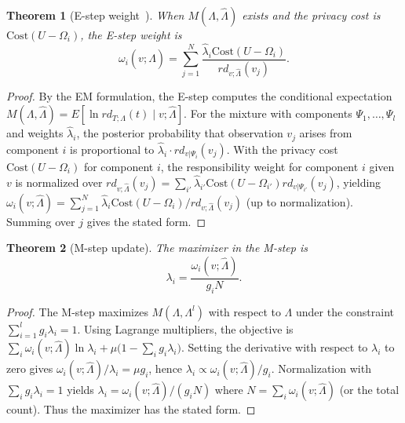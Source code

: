 \documentclass[journal,transmag]{IEEEtran}
\newtheorem{theorem}{Theorem}[section]
\begin{document}
\begin{theorem}[E-step weight~\cite{dempster-laird-rubin-77}]
\label{thm:estep}
When $M(\Lambda,\hat{\Lambda})$ exists and the privacy cost is $\mathrm{Cost}(U - \Omega_i)$, the E-step weight is
\begin{equation}
\omega_i(v;\hat{\Lambda}) = \sum_{j=1}^N \frac{\hat{\lambda}_i \mathrm{Cost}(U - \Omega_i)}{rd_{v;\hat{\Lambda}}(v_j)}.
\end{equation}
\end{theorem}
\begin{proof}
By the EM formulation, the E-step computes the conditional expectation $M(\Lambda,\hat{\Lambda}) = E[\ln rd_{T;\Lambda}(t) \mid v; \hat{\Lambda}]$. For the mixture with components $\Psi_1,\ldots,\Psi_l$ and weights $\hat{\lambda}_i$, the posterior probability that observation $v_j$ arises from component $i$ is proportional to $\hat{\lambda}_i \cdot rd_{v|\Psi_i}(v_j)$. With the privacy cost $\mathrm{Cost}(U - \Omega_i)$ for component $i$, the responsibility weight for component $i$ given $v$ is normalized over $rd_{v;\hat{\Lambda}}(v_j) = \sum_{i'} \hat{\lambda}_{i'} \mathrm{Cost}(U - \Omega_{i'}) rd_{v|\Psi_{i'}}(v_j)$, yielding $\omega_i(v;\hat{\Lambda}) = \sum_{j=1}^N \hat{\lambda}_i \mathrm{Cost}(U - \Omega_i) / rd_{v;\hat{\Lambda}}(v_j)$ (up to normalization). Summing over $j$ gives the stated form.
\end{proof}

\begin{theorem}[M-step update]
\label{thm:mstep}
The maximizer in the M-step is
\begin{equation}
\lambda_i = \frac{\omega_i(v;\hat{\Lambda})}{g_i N}.
\end{equation}
\end{theorem}
\begin{proof}
The M-step maximizes $M(\Lambda,\Lambda^l)$ with respect to $\Lambda$ under the constraint $\sum_{i=1}^l g_i \lambda_i = 1$. Using Lagrange multipliers, the objective is $\sum_i \omega_i(v;\hat{\Lambda}) \ln \lambda_i + \mu\bigl(1 - \sum_i g_i \lambda_i\bigr)$. Setting the derivative with respect to $\lambda_i$ to zero gives $\omega_i(v;\hat{\Lambda})/\lambda_i = \mu g_i$, hence $\lambda_i \propto \omega_i(v;\hat{\Lambda})/g_i$. Normalization with $\sum_i g_i \lambda_i = 1$ yields $\lambda_i = \omega_i(v;\hat{\Lambda})/(g_i N)$ where $N = \sum_i \omega_i(v;\hat{\Lambda})$ (or the total count). Thus the maximizer has the stated form.
\end{proof}
\end{document}
